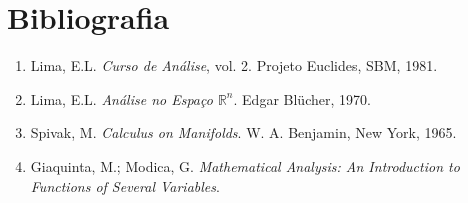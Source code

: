 \section*{Bibliografia}

\begin{enumerate}
    \item Lima, E.L. \textit{Curso de Análise}, vol. 2. Projeto Euclides, SBM, 1981.
    
    \item Lima, E.L. \textit{Análise no Espaço $\mathbb{R}^n$}. Edgar Blücher, 1970.
    
    \item Spivak, M. \textit{Calculus on Manifolds}. W. A. Benjamin, New York, 1965.
    
    \item Giaquinta, M.; Modica, G. \textit{Mathematical Analysis: An Introduction to Functions of Several Variables}.
\end{enumerate}
